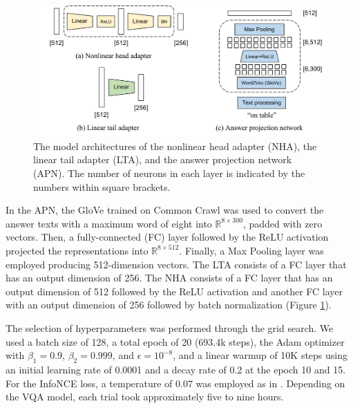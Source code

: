 \documentclass[letterpaper]{article} %
\begin{document}
\begin{figure}[!t]
    \centering
    \includegraphics[width=\linewidth]{figures/model_components.pdf}
    \caption{The model architectures of the nonlinear head adapter (NHA), the linear tail adapter (LTA), and the answer projection network (APN). The number of neurons in each layer is indicated by the numbers within square brackets.}
    \label{fig:arch}
\end{figure}

In the APN, the GloVe \cite{pennington2014glove} trained on Common Crawl was used to convert the answer texts with a maximum word of eight into $\mathbb{R}^{8\times 300}$, padded with zero vectors. Then, a fully-connected (FC) layer followed by the ReLU activation projected the representations into $\mathbb{R}^{8\times 512}$. Finally, a Max Pooling layer was employed producing 512-dimension vectors. The LTA consists of a FC layer that has an output dimension of 256. The NHA consists of a FC layer that has an output dimension of 512 followed by the ReLU activation and another FC layer with an output dimension of 256 followed by batch normalization (Figure \ref{fig:arch}).

The selection of hyperparameters was performed through the grid search. We used a batch size of 128, a total epoch of 20 (693.4k steps), the Adam optimizer with $\beta_1=0.9$, $\beta_2=0.999$, and $\epsilon=10^{-8}$, and a linear warmup of 10K steps using an initial learning rate of 0.0001 and a decay rate of 0.2 at the epoch 10 and 15. For the InfoNCE loss, a temperature of 0.07 was employed as in \cite{patrick2020}. Depending on the VQA model, each trial took approximately five to nine hours.
\end{document}
